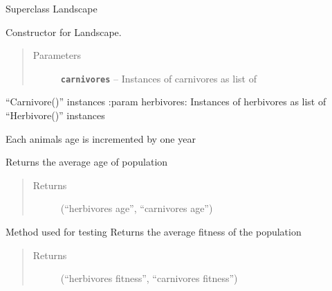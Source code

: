\documentclass[a4paper,10pt,openany,oneside]{sphinxmanual}
\begin{document}
\begin{fulllineitems}
\label{landscape:biosim.landscape.Landscape}
Superclass Landscape

Constructor for Landscape.
\begin{quote}\begin{description}
\item[{Parameters}] \leavevmode
\textbf{\texttt{carnivores}} -- Instances of carnivores as list of

\end{description}\end{quote}

``Carnivore()'' instances
:param herbivores: Instances of herbivores as list of
``Herbivore()'' instances

\begin{fulllineitems}
\label{landscape:biosim.landscape.Landscape.age_cycle}
Each animals age is incremented by one year

\end{fulllineitems}


\begin{fulllineitems}
\label{landscape:biosim.landscape.Landscape.avg_age}
Returns the average age of population
\begin{quote}\begin{description}
\item[{Returns}] \leavevmode
(``herbivores age'', ``carnivores age'')

\end{description}\end{quote}

\end{fulllineitems}


\begin{fulllineitems}
\label{landscape:biosim.landscape.Landscape.avg_fitness}
Method used for testing
Returns the average fitness of the population
\begin{quote}\begin{description}
\item[{Returns}] \leavevmode
(``herbivores fitness'', ``carnivores fitness'')


\end{description}
\end{quote}
\end{fulllineitems}
\end{fulllineitems}
\end{document}
